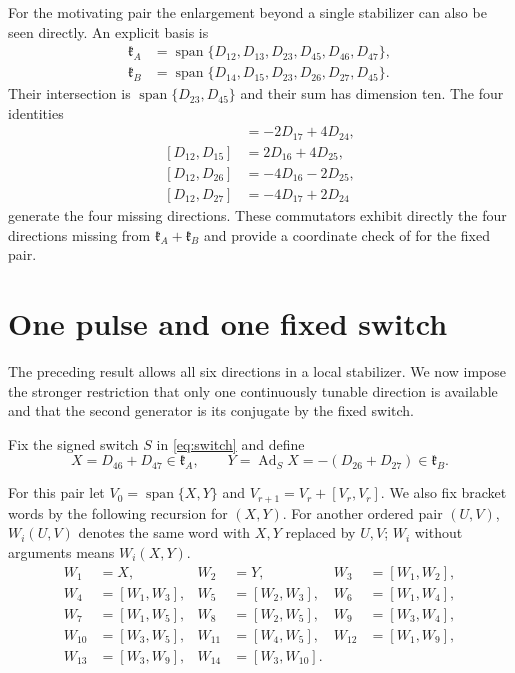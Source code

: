 \documentclass[11pt,a4paper]{article}
\newcommand{\Ad}{\operatorname{Ad}}
\newcommand{\Span}{\operatorname{span}}
\begin{document}
For the motivating pair the enlargement beyond a single stabilizer can also be seen directly.  An explicit basis is
\begin{align}
\mathfrak k_A&=\Span\{D_{12},D_{13},D_{23},D_{45},D_{46},D_{47}\},\\
\mathfrak k_B&=\Span\{D_{14},D_{15},D_{23},D_{26},D_{27},D_{45}\}.
\end{align}
Their intersection is $\Span\{D_{23},D_{45}\}$ and their sum has dimension ten.  The four identities
\begin{align}
[D_{12},D_{14}]&=-2D_{17}+4D_{24},\\
[D_{12},D_{15}]&= 2D_{16}+4D_{25},\\
[D_{12},D_{26}]&=-4D_{16}-2D_{25},\\
[D_{12},D_{27}]&=-4D_{17}+2D_{24}
\end{align}
generate the four missing directions.  These commutators exhibit directly the four directions missing from $\mathfrak k_A+\mathfrak k_B$ and provide a coordinate check of  for the fixed pair.

\section{One pulse and one fixed switch}
\label{sec:single}

The preceding result allows all six directions in a local stabilizer.  We now impose the stronger restriction that only one continuously tunable direction is available and that the second generator is its conjugate by the fixed switch.

Fix the signed switch $S$ in \eqref{eq:switch} and define
\begin{equation}
X=D_{46}+D_{47}\in\mathfrak k_A,
\qquad
Y=\Ad_SX=-(D_{26}+D_{27})\in\mathfrak k_B.
\label{eq:XY}
\end{equation}

For this pair let $V_0=\Span\{X,Y\}$ and $V_{r+1}=V_r+[V_r,V_r]$.
We also fix bracket words by the following recursion for $(X,Y)$.
For another ordered pair $(U,V)$, $W_i(U,V)$ denotes the same word with
$X,Y$ replaced by $U,V$; $W_i$ without arguments means $W_i(X,Y)$.
\begin{align*}
W_1&=X,&W_2&=Y,&W_3&=[W_1,W_2],\\
W_4&=[W_1,W_3],&W_5&=[W_2,W_3],&W_6&=[W_1,W_4],\\
W_7&=[W_1,W_5],&W_8&=[W_2,W_5],&W_9&=[W_3,W_4],\\
W_{10}&=[W_3,W_5],&W_{11}&=[W_4,W_5],&W_{12}&=[W_1,W_9],\\
W_{13}&=[W_3,W_9],&W_{14}&=[W_3,W_{10}].
\end{align*}
\end{document}
